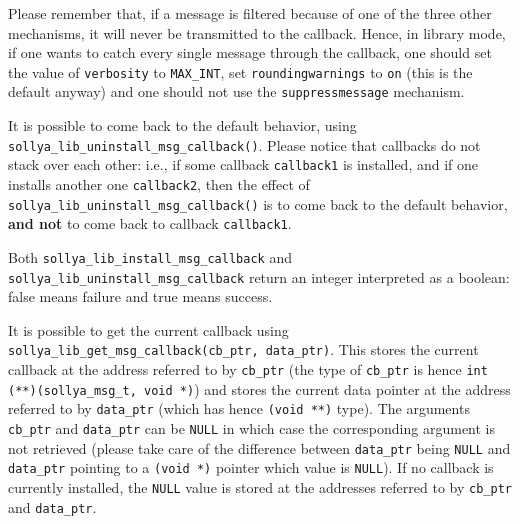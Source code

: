 \documentclass[a4paper]{article}
\begin{document}
Please remember that, if a message is filtered because of one of the three other mechanisms, it will never be transmitted to the callback. Hence, in library mode, if one wants to catch every single message through the callback, one should set the value of \verb|verbosity| to \verb|MAX_INT|, set \verb|roundingwarnings| to \verb|on| (this is the default anyway) and one should not use the \verb|suppressmessage| mechanism.

It is possible to come back to the default behavior, using \verb|sollya_lib_uninstall_msg_callback()|. Please notice that callbacks do not stack over each other: i.e., if some callback \verb|callback1| is installed, and if one installs another one \verb|callback2|, then the effect of \verb|sollya_lib_uninstall_msg_callback()| is to come back to the default behavior, \textbf{and not} to come back to callback \verb|callback1|.

Both \verb|sollya_lib_install_msg_callback| and \verb|sollya_lib_uninstall_msg_callback| return an integer interpreted as a boolean: false means failure and true means success.

It is possible to get the current callback using \verb|sollya_lib_get_msg_callback(cb_ptr, data_ptr)|. This stores the current callback at the address referred to by \verb|cb_ptr| (the type of \verb|cb_ptr| is hence \verb|int (**)(sollya_msg_t, void *)|) and stores the current data pointer at the address referred to by \verb|data_ptr| (which has hence \verb|(void **)| type). The arguments \verb|cb_ptr| and \verb|data_ptr| can be \verb|NULL| in which case the corresponding argument is not retrieved (please take care of the difference between \verb|data_ptr| being \verb|NULL| and \verb|data_ptr| pointing to a \verb|(void *)| pointer which value is \verb|NULL|). If no callback is currently installed, the \verb|NULL| value is stored at the addresses referred to by \verb|cb_ptr| and \verb|data_ptr|.
\end{document}
